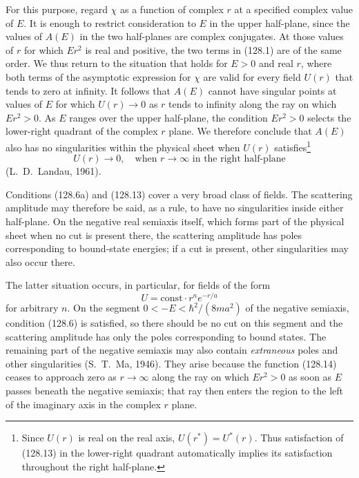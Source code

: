 For this purpose, regard $\chi$ as a function of complex $r$ at a specified complex value of $E$. It is enough to restrict consideration to $E$ in the upper half-plane, since the values of $A(E)$ in the two half-planes are complex conjugates. At those values of $r$ for which $Er^2$ is real and positive, the two terms in (128.1) are of the same order. We thus return to the situation that holds for $E>0$ and real $r$, where both terms of the asymptotic expression for $\chi$ are valid for every field $U(r)$ that tends to zero at infinity. It follows that $A(E)$ cannot have singular points at values of $E$ for which $U(r)\to0$ as $r$ tends to infinity along the ray on which $Er^2>0$. As $E$ ranges over the upper half-plane, the condition $Er^2>0$ selects the lower-right quadrant of the complex $r$ plane. We therefore conclude that $A(E)$ also has no singularities within the physical sheet when $U(r)$ satisfies\footnote{Since $U(r)$ is real on the real axis, $U(r^*)=U^*(r)$. Thus satisfaction of (128.13) in the lower-right quadrant automatically implies its satisfaction throughout the right half-plane.}
\begin{equation}
 U(r)\to0,\quad\text{when }r\to\infty\text{ in the right half-plane}
 \tag{128.13}
\end{equation}
(L.~D.~Landau, 1961).

Conditions (128.6a) and (128.13) cover a very broad class of fields. The scattering amplitude may therefore be said, as a rule, to have no singularities inside either half-plane. On the negative real semiaxis itself, which forms part of the physical sheet when no cut is present there, the scattering amplitude has poles corresponding to bound-state energies; if a cut is present, other singularities may also occur there.

The latter situation occurs, in particular, for fields of the form
\begin{equation}
 U=\mathrm{const}\cdot r^n e^{-r/a}
 \tag{128.14}
\end{equation}
for arbitrary $n$. On the segment $0<-E<\hbar^2/(8ma^2)$ of the negative semiaxis, condition (128.6) is satisfied, so there should be no cut on this segment and the scattering amplitude has only the poles corresponding to bound states. The remaining part of the negative semiaxis may also contain \emph{extraneous} poles and other singularities (S.~T.~Ma, 1946). They arise because the function (128.14) ceases to approach zero as $r\to\infty$ along the ray on which $Er^2>0$ as soon as $E$ passes beneath the negative semiaxis; that ray then enters the region to the left of the imaginary axis in the complex $r$ plane.

